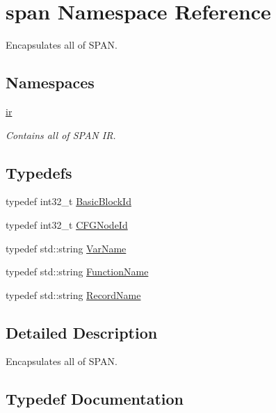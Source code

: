 \hypertarget{namespacespan}{}\section{span Namespace Reference}
\label{namespacespan}


Encapsulates all of S\+P\+AN.  


\subsection*{Namespaces}
\begin{DoxyCompactItemize}
\item 
 \hyperlink{namespacespan_1_1ir}{ir}
\begin{DoxyCompactList}\small\item\em Contains all of S\+P\+AN IR. \end{DoxyCompactList}\end{DoxyCompactItemize}
\subsection*{Typedefs}
\begin{DoxyCompactItemize}
\item 
typedef int32\+\_\+t \hyperlink{namespacespan_ab988dafbd25ab39838239b91d6a86214}{Basic\+Block\+Id}
\item 
typedef int32\+\_\+t \hyperlink{namespacespan_a34e8d849ca2007fe03cb1817685d08bf}{C\+F\+G\+Node\+Id}
\item 
typedef std\+::string \hyperlink{namespacespan_adc1e351442e4f323d37dbbb8736d003f}{Var\+Name}
\item 
typedef std\+::string \hyperlink{namespacespan_a5184c08609df37077d47e497f83aadd1}{Function\+Name}
\item 
typedef std\+::string \hyperlink{namespacespan_a556ddaab2ad6c39fb1d89fb38182fe57}{Record\+Name}
\end{DoxyCompactItemize}


\subsection{Detailed Description}
Encapsulates all of S\+P\+AN. 

\subsection{Typedef Documentation}
\mbox{\label{namespacespan_ab988dafbd25ab39838239b91d6a86214}} 
